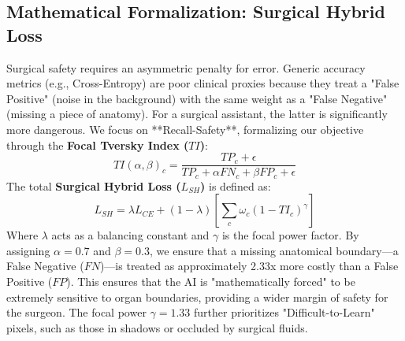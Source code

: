 \documentclass[conference]{IEEEtran}
\begin{document}
\subsection{Mathematical Formalization: Surgical Hybrid Loss}
Surgical safety requires an asymmetric penalty for error. Generic accuracy metrics (e.g., Cross-Entropy) are poor clinical proxies because they treat a "False Positive" (noise in the background) with the same weight as a "False Negative" (missing a piece of anatomy). For a surgical assistant, the latter is significantly more dangerous. We focus on **Recall-Safety**, formalizing our objective through the \textbf{Focal Tversky Index ($TI$)}:
\begin{equation}
TI(\alpha, \beta)_c = \frac{TP_c + \epsilon}{TP_c + \alpha FN_c + \beta FP_c + \epsilon}
\end{equation}
The total \textbf{Surgical Hybrid Loss ($L_{SH}$)} is defined as:
\begin{equation}
L_{SH} = \lambda L_{CE} + (1-\lambda) [ \sum_{c} \omega_c(1 - TI_c)^\gamma ]
\end{equation}
Where $\lambda$ acts as a balancing constant and $\gamma$ is the focal power factor. By assigning \textbf{$\alpha=0.7$} and \textbf{$\beta=0.3$}, we ensure that a missing anatomical boundary—a False Negative ($FN$)—is treated as approximately 2.33x more costly than a False Positive ($FP$). This ensures that the AI is "mathematically forced" to be extremely sensitive to organ boundaries, providing a wider margin of safety for the surgeon. The focal power $\gamma=1.33$ further prioritizes "Difficult-to-Learn" pixels, such as those in shadows or occluded by surgical fluids.
\end{document}
